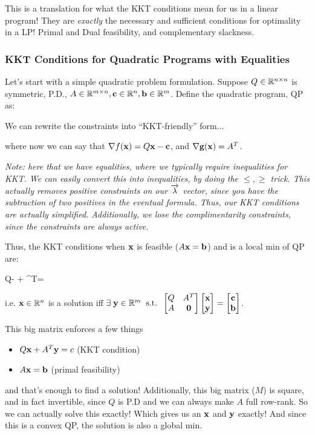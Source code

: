 This is a translation for what the KKT conditions mean for us in a linear
program! They are \textit{exactly} the necessary and sufficient conditions
for optimality in a LP! Primal and Dual feasibility, and complementary slackness.

\subsubsection{KKT Conditions for Quadratic Programs with Equalities}

Let's start with a simple quadratic problem formulation.
Suppose $Q \in \mathbb{R}^{n \times n}$ is symmetric, P.D.,
$A \in \mathbb{R}^{m \times n}, \mathbf{c} \in \mathbb{R}^n, \mathbf{b} \in \mathbb{R}^m$.
Define the quadratic program, QP as: 

We can rewrite the constraints into ``KKT-friendly'' form...  
where now we can say that $\nabla f(\mathbf{x}) = Q\mathbf{x} - \mathbf{c}$, and
$\nabla \mathbf{g}(\mathbf{x}) = A^T$.

\label{sec:kkt-trick}
\textit{Note: here that we have equalities, where we typically require inequalities for
KKT. We can easily convert this into inequalities, by doing the $\leq, \geq$ trick.
This actually removes positive constraints on our $\overrightarrow{\lambda}$ vector, since you have the 
subtraction of two positives in the eventual formula. Thus, our KKT conditions
are actually simplified. Additionally, we lose the complimentarity constraints,
since the constraints are always active.}

Thus, the KKT conditions when $\mathbf{x}$ is feasible ($A\mathbf{x} = \mathbf{b}$) and is a local min
of QP are:
\begin{frml}
Q\vx - \vc + \vA^T\vy = \vzero
\end{frml}
i.e. $\mathbf{x} \in \mathbb{R}^n$ is a solution iff $\exists \; \mathbf{y} \in \mathbb{R}^m \;\; \text{s.t.} \;\;
\begin{bmatrix} Q & A^T \\ A & \mathbf{0} \end{bmatrix} \begin{bmatrix} \mathbf{x} \\ \mathbf{y} \end{bmatrix} = \begin{bmatrix} \mathbf{c} \\ \mathbf{b} \end{bmatrix}$.

This big matrix enforces a few things
\begin{itemize}
	\item $Q\mathbf{x} + A^T\mathbf{y} = c$ (KKT condition)
	\item $A\mathbf{x} = \mathbf{b}$ (primal feasibility)
\end{itemize}
and that's enough to find a solution! Additionally, this big matrix ($M$) is
square, and in fact invertible, since $Q$ is P.D and we can always make $A$ 
full row-rank. So we can actually
solve this exactly! Which gives us an $\mathbf{x}$ and $\mathbf{y}$ exactly! And since this
is a convex QP, the solution is also a global min.


